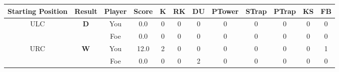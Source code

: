 \documentclass[a4paper,12pt]{article}
\begin{document}
  \begin{tabular}[t]{| c | c | c | c | c | c | c | c | c | c | c | c
      |}
    \hline
    Starting Position & \textbf{Result} & Player & \textbf{Score} & K & RK & DU & PTower & STrap & PTrap & KS & FB \\
    
      
                      
      
                      
      
                      
      
                      
      
                      
      
                      
      
                      
      
                      
      
        \hline
        \multirow{2}{*}{  ULC  } &
              \multirow{2}{*}{  
                  \textbf{D}  } & 
                    \cellcolor{yellow!25} You & \cellcolor{yellow!25} 0.0 & \cellcolor{yellow!25} 0 &
                    \cellcolor{yellow!25} 0 & \cellcolor{yellow!25} 0 & \cellcolor{yellow!25} 0 &
                    \cellcolor{yellow!25} 0 & \cellcolor{yellow!25} 0 & \cellcolor{yellow!25} 0 &
                    \cellcolor{yellow!25} 0 \\
                    \cline{3-12}
                    & & \cellcolor{red!15} Foe & \cellcolor{red!15} 0.0 & \cellcolor{red!15} 0 & \cellcolor{red!15}
                    0 & \cellcolor{red!15} 0
                    & \cellcolor{red!15} 0 & \cellcolor{red!15}
                    0 & \cellcolor{red!15} 0 
                    & \cellcolor{red!15} 0 & \cellcolor{red!15}
                    0 \\
                    
                      
      
                      
      
                      
      
        \hline
        \multirow{2}{*}{  URC
             } &
              \multirow{2}{*}{  \textbf{W}  } & 
                    \cellcolor{yellow!25} You & \cellcolor{yellow!25} 12.0 & \cellcolor{yellow!25} 2 &
                    \cellcolor{yellow!25} 0 & \cellcolor{yellow!25} 0 & \cellcolor{yellow!25} 0 &
                    \cellcolor{yellow!25} 0 & \cellcolor{yellow!25} 0 & \cellcolor{yellow!25} 0 &
                    \cellcolor{yellow!25} 1 \\
                    \cline{3-12}
                    & & \cellcolor{red!15} Foe & \cellcolor{red!15} 0.0 & \cellcolor{red!15} 0 & \cellcolor{red!15}
                    0 & \cellcolor{red!15} 2
                    & \cellcolor{red!15} 0 & \cellcolor{red!15}
                    0 & \cellcolor{red!15} 0 
                    & \cellcolor{red!15} 0 & \cellcolor{red!15}
                    0 \\
                    

\end{tabular}
\end{document}
